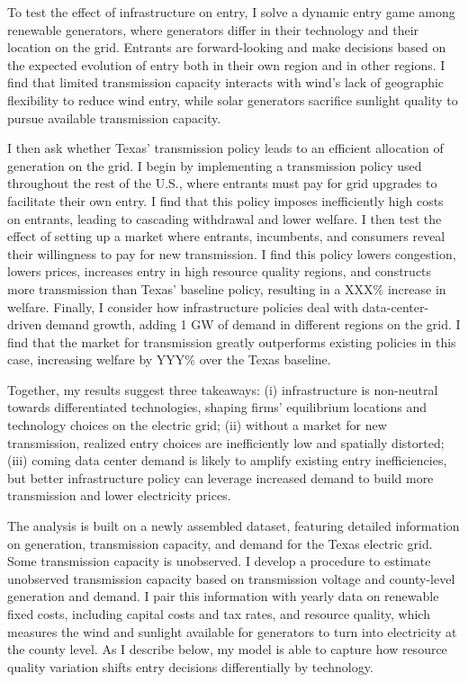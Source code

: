 \documentclass[12pt]{article}
\begin{document}
To test the effect of infrastructure on entry, I solve a dynamic entry game among renewable generators, where generators differ in their technology and their location on the grid. Entrants are forward-looking and make decisions based on the expected evolution of entry both in their own region and in other regions. I find that limited transmission capacity interacts with wind's lack of geographic flexibility to reduce wind entry, while solar generators sacrifice sunlight quality to pursue available transmission capacity. 

I then ask whether Texas' transmission policy leads to an efficient allocation of generation on the grid. I begin by implementing a transmission policy used throughout the rest of the U.S., where entrants must pay for grid upgrades to facilitate their own entry. I find that this policy imposes inefficiently high costs on entrants, leading to cascading withdrawal and lower welfare. I then test the effect of setting up a market where entrants, incumbents, and consumers reveal their willingness to pay for new transmission. I find this policy lowers congestion, lowers prices, increases entry in high resource quality regions, and constructs more transmission than Texas' baseline policy, resulting in a XXX\% increase in welfare. Finally, I consider how infrastructure policies deal with data-center-driven demand growth, adding 1 GW of demand in different regions on the grid. I find that the market for transmission greatly outperforms existing policies in this case, increasing welfare by YYY\% over the Texas baseline. 

Together, my results suggest three takeaways: (i) infrastructure is non-neutral towards differentiated technologies, shaping firms' equilibrium locations and technology choices on the electric grid; (ii) without a market for new transmission, realized entry choices are inefficiently low and spatially distorted; (iii) coming data center demand is likely to amplify existing entry inefficiencies, but better infrastructure policy can leverage increased demand to build more transmission and lower electricity prices.

The analysis is built on a newly assembled dataset, featuring detailed information on generation, transmission capacity, and demand for the Texas electric grid. Some transmission capacity is unobserved. I develop a procedure to estimate unobserved transmission capacity based on transmission voltage and county-level generation and demand. I pair this information with yearly data on renewable fixed costs, including capital costs and tax rates, and resource quality, which measures the wind and sunlight available for generators to turn into electricity at the county level. As I describe below, my model is able to capture how resource quality variation shifts entry decisions differentially by technology.
\end{document}
